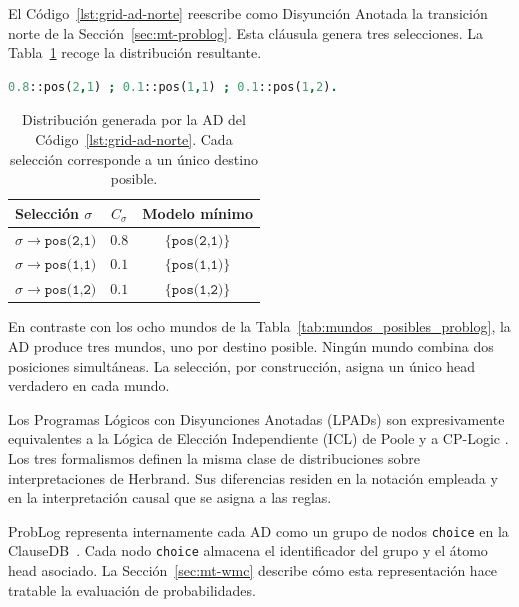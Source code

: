 El Código~\ref{lst:grid-ad-norte} reescribe como Disyunción Anotada la transición norte de la Sección~\ref{sec:mt-problog}. Esta cláusula genera tres selecciones. La Tabla~\ref{tab:mundos_posibles_ad} recoge la distribución resultante.

\begin{lstlisting}[caption={Transición norte desde $(1,1)$ representada como Disyunción Anotada.}, label={lst:grid-ad-norte}, language=Prolog]
0.8::pos(2,1) ; 0.1::pos(1,1) ; 0.1::pos(1,2).
\end{lstlisting}

\begin{table}[ht]
\centering
\caption{Distribución generada por la AD del Código~\ref{lst:grid-ad-norte}. Cada selección corresponde a un único destino posible.}
\label{tab:mundos_posibles_ad}
\begin{tabular}{lcc}
\toprule
Selección $\sigma$ & $C_\sigma$ & Modelo mínimo \\
\midrule
$\sigma \to \texttt{pos(2,1)}$ & $0.8$ & $\{\texttt{pos(2,1)}\}$ \\
$\sigma \to \texttt{pos(1,1)}$ & $0.1$ & $\{\texttt{pos(1,1)}\}$ \\
$\sigma \to \texttt{pos(1,2)}$ & $0.1$ & $\{\texttt{pos(1,2)}\}$ \\
\bottomrule
\end{tabular}
\end{table}

En contraste con los ocho mundos de la Tabla~\ref{tab:mundos_posibles_problog}, la AD produce tres mundos, uno por destino posible. Ningún mundo combina dos posiciones simultáneas. La selección, por construcción, asigna un único head verdadero en cada mundo.

Los Programas Lógicos con Disyunciones Anotadas (LPADs) son expresivamente equivalentes a la Lógica de Elección Independiente (ICL) de Poole \cite{poole1997independent} y a CP-Logic \cite{vennekens2009cplogic}. Los tres formalismos definen la misma clase de distribuciones sobre interpretaciones de Herbrand. Sus diferencias residen en la notación empleada y en la interpretación causal que se asigna a las reglas.

ProbLog representa internamente cada AD como un grupo de nodos \texttt{choice} en la ClauseDB~\cite{fierens2015inference}. Cada nodo \texttt{choice} almacena el identificador del grupo y el átomo head asociado. La Sección~\ref{sec:mt-wmc} describe cómo esta representación hace tratable la evaluación de probabilidades.

